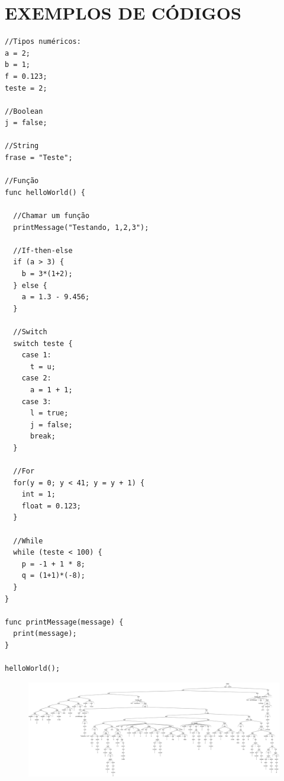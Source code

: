 \section{\label{sec3}\normalsize EXEMPLOS DE CÓDIGOS}
	
	\begin{lstlisting}
//Tipos numéricos:
a = 2;
b = 1;
f = 0.123;
teste = 2;
	
//Boolean	
j = false;
	
//String
frase = "Teste";
	
//Função
func helloWorld() {

  //Chamar um função
  printMessage("Testando, 1,2,3");
		
  //If-then-else
  if (a > 3) {
    b = 3*(1+2);
  } else {
    a = 1.3 - 9.456;
  }
		
  //Switch
  switch teste {
    case 1:
      t = u;
    case 2:
      a = 1 + 1;
    case 3:
      l = true;
      j = false;
      break;
  }
		
  //For
  for(y = 0; y < 41; y = y + 1) {
    int = 1;
    float = 0.123;
  }
		
  //While
  while (teste < 100) {
    p = -1 + 1 * 8;
    q = (1+1)*(-8);
  }
}
	
func printMessage(message) {
  print(message);
}

helloWorld();
	\end{lstlisting}	
	\newpage
	\begin{figure}
	\includegraphics[width=1\textheight,height=0.8\textwidth]{01.png}
	\end{figure}